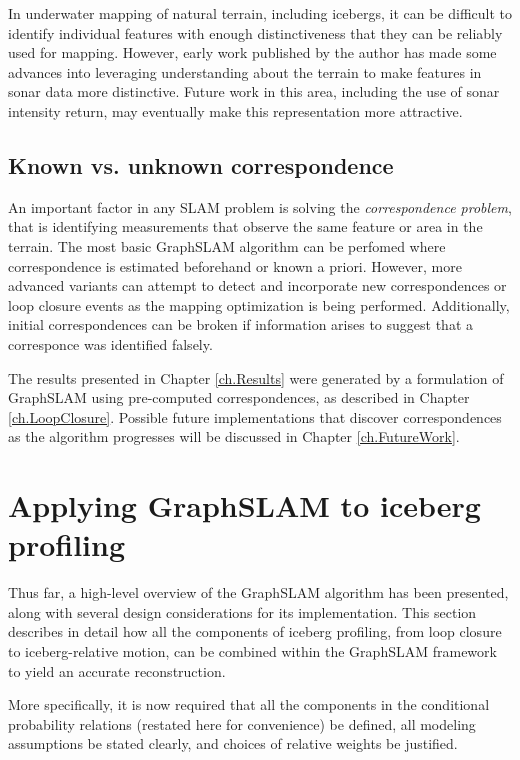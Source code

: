 In underwater mapping of natural terrain, including icebergs, it can be difficult to identify individual features with enough distinctiveness that they can be reliably used for mapping. However, early work published by the author has made some advances into leveraging understanding about the terrain to make features in sonar data more distinctive. \cite{me!} Future work in this area, including the use of sonar intensity return, may eventually make this representation more attractive.


\subsection{Known vs. unknown correspondence}

An important factor in any SLAM problem is solving the \emph{correspondence problem}, that is identifying measurements that observe the same feature or area in the terrain. The most basic GraphSLAM algorithm can be perfomed where correspondence is estimated beforehand or known a priori. However, more advanced variants can attempt to detect and incorporate new correspondences or loop closure events as the mapping optimization is being performed. Additionally, initial correspondences can be broken if information arises to suggest that a corresponce was identified falsely. 

The results presented in Chapter \ref{ch.Results} were generated by a formulation of GraphSLAM using pre-computed correspondences, as described in Chapter \ref{ch.LoopClosure}. Possible future implementations that discover correspondences as the algorithm progresses will be discussed in Chapter \ref{ch.FutureWork}.

\section{Applying GraphSLAM to iceberg profiling}

Thus far, a high-level overview of the GraphSLAM algorithm has been presented, along with several design considerations for its implementation. This section describes in detail how all the components of iceberg profiling, from loop closure to iceberg-relative motion, can be combined within the GraphSLAM framework to  yield an accurate reconstruction. 

More specifically, it is now required that all the components in the conditional probability relations (restated here for convenience) be defined, all modeling assumptions be stated clearly, and choices of relative weights be justified. 


